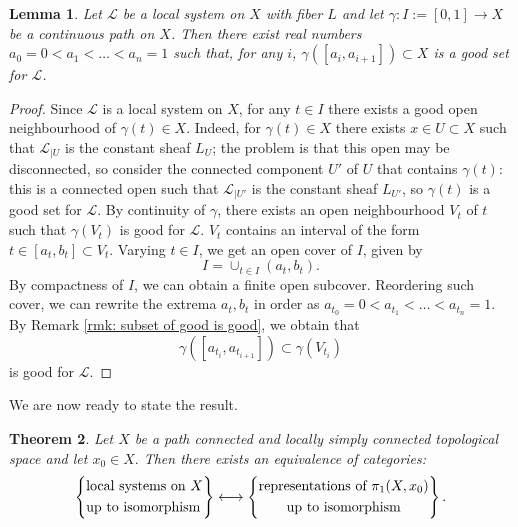 \documentclass[a4paper,12 pt,titlepage,twoside]{book}
\newcommand{\ls}{\mathcal{L}}
\theoremstyle{plain}
\newtheorem{thm}{Theorem}[section]
\theoremstyle{theorem}
\newtheorem{lemma}[thm]{Lemma}
\theoremstyle{definition}
\theoremstyle{remark}
\begin{document}
\begin{lemma}\label{lem: Lebesgue numbers lemma for intervals}
	Let $\ls$ be a local system on $X$ with fiber $L$ and let $\gamma \colon I:=[0,1] \rightarrow X$ be a continuous path on $X$. Then there exist real numbers $a_0=0 < a_1 < \dots < a_n=1$ such that, for any $i$, $\gamma([a_i,a_{i+1}]) \subset X$ is a good set for $\ls$.
\end{lemma}
\begin{proof}
	Since $\ls$ is a local system on $X$, for any $t \in I$ there exists a good open neighbourhood of $\gamma(t) \in X$. Indeed, for $\gamma(t) \in X$ there exists $x \in U \subset X$ such that $\ls_{\mid U}$ is the constant sheaf $L_U$; the problem is that this open may be disconnected, so consider the connected component $U'$ of $U$ that contains $\gamma(t)$: this is a connected open such that $\ls_{\mid U'}$ is the constant sheaf $L_{U'}$, so $\gamma(t)$ is a good set for $\ls.$ By continuity of $\gamma$, there exists an open neighbourhood $V_t$ of $t$ such that $\gamma(V_t)$ is good for $\ls.$ $V_t$ contains an interval of the form $t \in [a_t, b_t] \subset V_t$. Varying $t \in I$, we get an open cover of $I$, given by $$I = \cup_{t \in I} (a_t, b_t).$$ By compactness of $I$, we can obtain a finite open subcover. Reordering such cover, we can rewrite the extrema $a_t,b_t$ in order as $a_{t_0}=0 < a_{t_1} < \dots < a_{t_n}=1$. By Remark \ref{rmk: subset of good is good}, we obtain that $$\gamma([a_{t_i},a_{t_{i+1}}]) \subset \gamma(V_{t_i})$$ is good for $\ls.$
\end{proof}
We are now ready to state the result.
\begin{thm}\label{thm: equivalence local systems and representations}
	Let $X$ be a path connected and locally simply connected topological space and let $x_0 \in X.$ Then there exists an equivalence of categories:
	\begin{equation}\label{eq: equivalence local systems and representations}
	\left\{\begin{aligned}&\text{local systems on $X$}\\ &\text{up to isomorphism}\end{aligned}\right\} \longleftrightarrow \left\{\begin{aligned}&\text{representations of $\pi_1(X,x_0)$} \\ &\text{\qquad up to isomorphism}\end{aligned}\right\}.
	\end{equation}
\end{thm}
\end{document}
